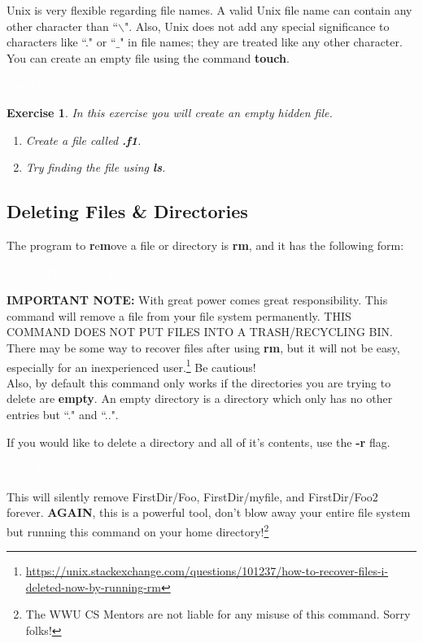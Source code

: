 \documentclass[oneside]{book}
\newcommand{\commandline}[1]{\begin{center} \colorbox{Dark}{\textcolor{white}{#1}} \end{center}}
\newtheorem{ex}{Exercise}[chapter]
\begin{document}
Unix is very flexible regarding file names. A valid Unix file name can contain any other character than ``$\backslash$". Also, Unix does not add any special significance to characters like ``." or ``$\_$" in file names; they are treated like any other character. You can create an empty file using the command \textbf{touch}.
\commandline{touch file_name}

\begin{ex} In this exercise you will create an empty hidden file.
    \begin{enumerate}
        \item Create a file called \textbf{.f1}.
        \item Try finding the file using \textbf{ls}.
    \end{enumerate}        
\end{ex}


\subsection{Deleting Files \& Directories}
The program to \textbf{r}e\textbf{m}ove a file or directory is \textbf{rm}, and it has the following form:
\commandline{rm [OPTION] ... [FILE]...}

\textbf{IMPORTANT NOTE:} With great power comes great responsibility. This command will remove a file from your file system permanently. THIS COMMAND DOES NOT PUT FILES INTO A TRASH/RECYCLING BIN. There may be some way to recover files after using \textbf{rm}, but it will not be easy, especially for an inexperienced user.\footnote{\url{https://unix.stackexchange.com/questions/101237/how-to-recover-files-i-deleted-now-by-running-rm}} Be cautious! \\

Also, by default this command only works if the directories you are trying to delete are \textbf{empty}. An empty directory is a directory which only has no other entries but ``." and ``..".

If you would like to delete a directory and all of it's contents, use the \textbf{-r} flag.\\
\commandline{rm -r FirstDir} 

This will silently remove FirstDir/Foo, FirstDir/myfile, and FirstDir/Foo2 forever. \textbf{AGAIN}, this is a powerful tool, don't blow away your entire file system but running this command on your home directory!\footnote{The WWU CS Mentors are not liable for any misuse of this command. Sorry folks!} 
\end{document}
